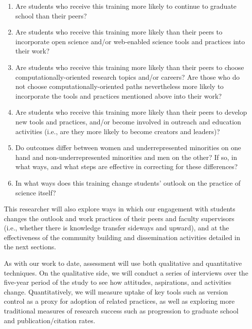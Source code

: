 \documentclass[11pt]{article}
\begin{document}
\begin{enumerate}

\item
  Are students who receive this training more likely to continue to
  graduate school than their peers?

\item
  Are students who receive this training more likely than their peers
  to incorporate open science and/or web-enabled science tools and
  practices into their work?

\item
  Are students who receive this training more likely than their peers
  to choose computationally-oriented research topics and/or careers?
  Are those who do not choose computationally-oriented paths
  nevertheless more likely to incorporate the tools and practices
  mentioned above into their work?

\item
  Are students who receive this training more likely than their peers
  to develop new tools and practices, and/or become involved in
  outreach and education activities (i.e., are they more likely to
  become creators and leaders)?

\item
  Do outcomes differ between women and underrepresented minorities on
  one hand and non-underrepresented minorities and men on the other?
  If so, in what ways, and what steps are effective in correcting for
  these differences?

\item
  In what ways does this training change students' outlook on the
  practice of science itself?

\end{enumerate}

This researcher will also explore ways in which our engagement with
students changes the outlook and work practices of their peers and
faculty supervisors (i.e., whether there is knowledge transfer
sideways and upward), and at the effectiveness of the community
building and dissemination activities detailed in the next sections.

As with our work to date, assessment will use both qualitative and
quantitative techniques.  On the qualitative side, we will conduct a
series of interviews over the five-year period of the study to see how
attitudes, aspirations, and activities change.  Quantitatively, we
will measure uptake of key tools such as version control as a proxy
for adoption of related practices, as well as exploring more
traditional measures of research success such as progression to
graduate school and publication/citation rates.  
\end{document}
